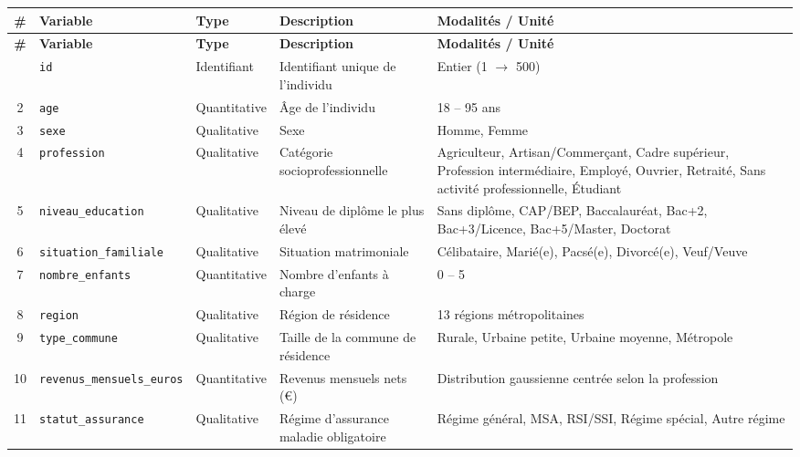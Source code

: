 \documentclass[11pt,a4paper]{memoirerecherche}
\begin{document}
\begingroup
\scriptsize
\begin{longtable}{@{} c l l p{3.8cm} p{5.5cm} @{}}
\toprule
\textbf{\#} & \textbf{Variable} & \textbf{Type} & \textbf{Description} & \textbf{Modalités / Unité} \\
\midrule
\endfirsthead
\toprule
\textbf{\#} & \textbf{Variable} & \textbf{Type} & \textbf{Description} & \textbf{Modalités / Unité} \\
\midrule
\endhead
\bottomrule
\endfoot
1  & \texttt{id}                             & Identifiant  & Identifiant unique de l'individu                     & Entier (1 $\rightarrow$ 500) \\
2  & \texttt{age}                            & Quantitative & Âge de l'individu                                    & 18 -- 95 ans \\
3  & \texttt{sexe}                           & Qualitative  & Sexe                                                 & Homme, Femme \\
4  & \texttt{profession}                     & Qualitative  & Catégorie socioprofessionnelle                       & Agriculteur, Artisan/Commerçant, Cadre supérieur, Profession intermédiaire, Employé, Ouvrier, Retraité, Sans activité professionnelle, Étudiant \\
5  & \texttt{niveau\_education}              & Qualitative  & Niveau de diplôme le plus élevé                      & Sans diplôme, CAP/BEP, Baccalauréat, Bac+2, Bac+3/Licence, Bac+5/Master, Doctorat \\
6  & \texttt{situation\_familiale}           & Qualitative  & Situation matrimoniale                               & Célibataire, Marié(e), Pacsé(e), Divorcé(e), Veuf/Veuve \\
7  & \texttt{nombre\_enfants}                & Quantitative & Nombre d'enfants à charge                            & 0 -- 5 \\
8  & \texttt{region}                         & Qualitative  & Région de résidence                                  & 13 régions métropolitaines \\
9  & \texttt{type\_commune}                  & Qualitative  & Taille de la commune de résidence                    & Rurale, Urbaine petite, Urbaine moyenne, Métropole \\
10 & \texttt{revenus\_mensuels\_euros}       & Quantitative & Revenus mensuels nets (€)                            & Distribution gaussienne centrée selon la profession \\
11 & \texttt{statut\_assurance}              & Qualitative  & Régime d'assurance maladie obligatoire               & Régime général, MSA, RSI/SSI, Régime spécial, Autre régime \\

\end{longtable}
\end{document}

